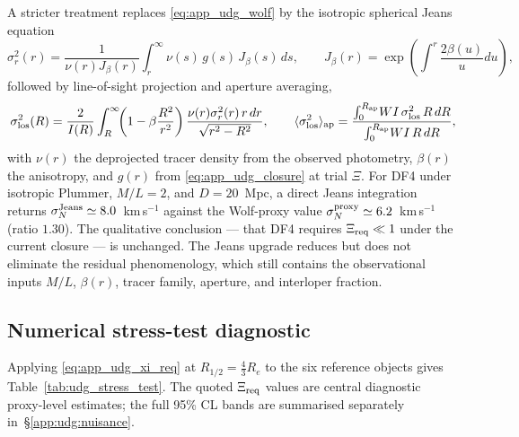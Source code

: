 A stricter treatment replaces \eqref{eq:app_udg_wolf} by the
isotropic spherical Jeans equation
\begin{equation}
\sigma_r^2(r)=\frac{1}{\nu(r)J_\beta(r)}
\int_r^\infty\!\nu(s)\,g(s)\,J_\beta(s)\,ds,
\qquad
J_\beta(r)=\exp\!\left(\int^r\!\frac{2\beta(u)}{u}du\right),
\end{equation}
followed by line-of-sight projection and aperture averaging,
\begin{equation}
\sigma_{\rm los}^2(R)=\frac{2}{I(R)}
\int_R^\infty\!\!\left(1-\beta\frac{R^2}{r^2}\right)
\frac{\nu(r)\sigma_r^2(r)\,r\,dr}{\sqrt{r^2-R^2}},
\qquad
\langle\sigma_{\rm los}^2\rangle_{\rm ap}=
\frac{\int_0^{R_{\rm ap}}\!W I\,\sigma_{\rm los}^2\,R\,dR}
{\int_0^{R_{\rm ap}}\!W I\,R\,dR},
\end{equation}
with $\nu(r)$ the deprojected tracer density from the observed
photometry, $\beta(r)$ the anisotropy, and $g(r)$ from
\eqref{eq:app_udg_closure} at trial $\Xi$.  For DF4 under isotropic
Plummer, $M/L=2$, and $D=20$~Mpc, a direct Jeans integration
returns $\sigma_N^{\rm Jeans}\simeq 8.0$~km\,s$^{-1}$ against the
Wolf-proxy value $\sigma_N^{\rm proxy}\simeq 6.2$~km\,s$^{-1}$
(ratio $1.30$).  The qualitative conclusion --- that DF4 requires
$\Xi_{\rm req}\ll 1$ under the current closure --- is unchanged.
The Jeans upgrade reduces but does not eliminate the residual
phenomenology, which still contains the observational inputs
$M/L$, $\beta(r)$, tracer family, aperture, and interloper
fraction.

\subsection{Numerical stress-test diagnostic}
\label{app:udg:numerical}

Applying \eqref{eq:app_udg_xi_req} at $R_{1/2}=\tfrac{4}{3}R_e$ to the
six reference objects gives Table~\ref{tab:udg_stress_test}.  The
quoted $\Xi_{\rm req}$ values are central diagnostic proxy-level
estimates; the full 95\% CL bands are summarised separately
in~\S\ref{app:udg:nuisance}.

